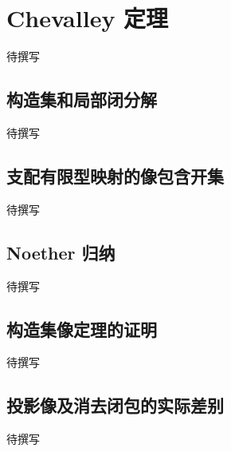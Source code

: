 
% 
% 

\section{Chevalley 定理}
\label{g5:sec:1103}

待撰写

\subsection{构造集和局部闭分解}
\label{g5:subsec:1103:01}
待撰写

\subsection{支配有限型映射的像包含开集}
\label{g5:subsec:1103:02}
待撰写

\subsection{Noether 归纳}
\label{g5:subsec:1103:03}
待撰写

\subsection{构造集像定理的证明}
\label{g5:subsec:1103:04}
待撰写

\subsection{投影像及消去闭包的实际差别}
\label{g5:subsec:1103:05}
待撰写
